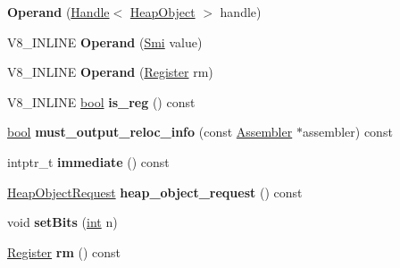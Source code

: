 \begin{DoxyCompactItemize}
{\bfseries Operand} (\mbox{\hyperlink{classv8_1_1internal_1_1Handle}{Handle}}$<$ \mbox{\hyperlink{classv8_1_1internal_1_1HeapObject}{Heap\+Object}} $>$ handle)
\item 
\mbox{\label{classv8_1_1internal_1_1Operand_a027e7cab65c73c00b2ef5381724dd3be}} 
V8\+\_\+\+I\+N\+L\+I\+NE {\bfseries Operand} (\mbox{\hyperlink{classv8_1_1internal_1_1Smi}{Smi}} value)
\item 
\mbox{\label{classv8_1_1internal_1_1Operand_afa91505837ddc2da0a1e92af8b54b097}} 
V8\+\_\+\+I\+N\+L\+I\+NE {\bfseries Operand} (\mbox{\hyperlink{classv8_1_1internal_1_1Register}{Register}} rm)
\item 
\mbox{\label{classv8_1_1internal_1_1Operand_ac595e80d0e3d2f2033227a0b58795587}} 
V8\+\_\+\+I\+N\+L\+I\+NE \mbox{\hyperlink{classbool}{bool}} {\bfseries is\+\_\+reg} () const
\item 
\mbox{\label{classv8_1_1internal_1_1Operand_a844776d6bd0526be04231cd8442bc644}} 
\mbox{\hyperlink{classbool}{bool}} {\bfseries must\+\_\+output\+\_\+reloc\+\_\+info} (const \mbox{\hyperlink{classv8_1_1internal_1_1Assembler}{Assembler}} $\ast$assembler) const
\item 
\mbox{\label{classv8_1_1internal_1_1Operand_a1208356f90c3adeabb7fe4c60ae95fdf}} 
intptr\+\_\+t {\bfseries immediate} () const
\item 
\mbox{\label{classv8_1_1internal_1_1Operand_a9beaf04cfc4aea3a9d725172753766ed}} 
\mbox{\hyperlink{classv8_1_1internal_1_1HeapObjectRequest}{Heap\+Object\+Request}} {\bfseries heap\+\_\+object\+\_\+request} () const
\item 
\mbox{\label{classv8_1_1internal_1_1Operand_a6f6fed066eb53f1de5d19e6517afd3d7}} 
void {\bfseries set\+Bits} (\mbox{\hyperlink{classint}{int}} n)
\item 
\mbox{\label{classv8_1_1internal_1_1Operand_ad0495c31017fd74b04574225b3af4d39}} 
\mbox{\hyperlink{classv8_1_1internal_1_1Register}{Register}} {\bfseries rm} () const

\end{DoxyCompactItemize}
